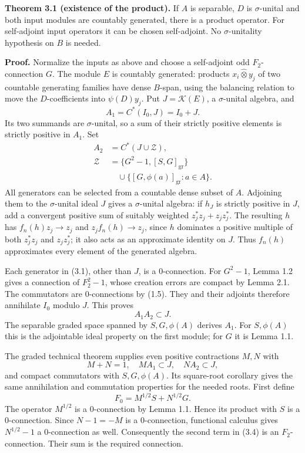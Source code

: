 \documentclass[
  11pt,
]{article}
\begin{document}
\textbf{Theorem 3.1 (existence of the product).} If \(A\) is separable,
\(D\) is \(\sigma\)-unital and both input modules are countably
generated, there is a product operator. For self-adjoint input operators
it can be chosen self-adjoint. No \(\sigma\)-unitality hypothesis on
\(B\) is needed.

\textbf{Proof.} Normalize the inputs as above and choose a self-adjoint
odd \(F_2\)-connection \(G\). The module \(E\) is countably generated:
products \(x_i\widehat\otimes y_j\) of two countable generating families
have dense \(B\)-span, using the balancing relation to move the
\(D\)-coefficients into \(\psi(D)y_j\). Put \(J=\mathcal K(E)\), a
\(\sigma\)-unital algebra, and \[
A_1=C^*(I_0,J)=I_0+J.
\] Its two summands are \(\sigma\)-unital, so a sum of their strictly
positive elements is strictly positive in \(A_1\). Set \[
\begin{aligned}
A_2&=C^*(J\cup\mathcal Z),\\
\mathcal Z&=\{G^2-1,[S,G]_{\mathrm{gr}}\}\\
&\quad\cup\{[G,\phi(a)]_{\mathrm{gr}}:a\in A\}.
\end{aligned}
\tag{3.1}
\] All generators can be selected from a countable dense subset of
\(A\). Adjoining them to the \(\sigma\)-unital ideal \(J\) gives a
\(\sigma\)-unital algebra: if \(h_J\) is strictly positive in \(J\), add
a convergent positive sum of suitably weighted \(z_j^*z_j+z_jz_j^*\).
The resulting \(h\) has \(f_n(h)z_j\to z_j\) and \(z_jf_n(h)\to z_j\),
since \(h\) dominates a positive multiple of both \(z_j^*z_j\) and
\(z_jz_j^*\); it also acts as an approximate identity on \(J\). Thus
\(f_n(h)\) approximates every element of the generated algebra.

Each generator in (3.1), other than \(J\), is a \(0\)-connection. For
\(G^2-1\), Lemma 1.2 gives a connection of \(F_2^2-1\), whose creation
errors are compact by Lemma 2.1. The commutators are \(0\)-connections
by (1.5). They and their adjoints therefore annihilate \(I_0\) modulo
\(J\). This proves \[
A_1A_2\subset J.
\tag{3.2}
\] The separable graded space spanned by \(S,G,\phi(A)\) derives
\(A_1\). For \(S,\phi(A)\) this is the adjointable ideal property on the
first module; for \(G\) it is Lemma 1.1.

The graded technical theorem supplies even positive contractions \(M,N\)
with \[
M+N=1,\quad MA_1\subset J,\quad NA_2\subset J,
\tag{3.3}
\] and compact commutators with \(S,G,\phi(A)\). Its square-root
corollary gives the same annihilation and commutation properties for the
needed roots. First define \[
F_0=M^{1/2}S+N^{1/2}G.
\tag{3.4}
\] The operator \(M^{1/2}\) is a \(0\)-connection by Lemma 1.1. Hence
its product with \(S\) is a \(0\)-connection. Since \(N-1=-M\) is a
\(0\)-connection, functional calculus gives \(N^{1/2}-1\) a
\(0\)-connection as well. Consequently the second term in (3.4) is an
\(F_2\)-connection. Their sum is the required connection.
\end{document}
